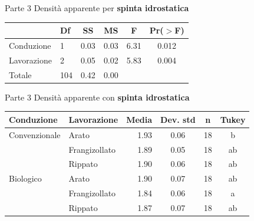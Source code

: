 \documentclass[10pt]{beamer}
\begin{document}
\begin{frame}{Parte 3 \small{Densità apparente per \bf{spinta idrostatica}}}
  \begin{table}
    \centering
    \begin{tabular}{llcccc}
      \hline
      & Df  & SS & MS & F & Pr($>$F) \\ 
      \hline
      Conduzione  & 1   & 0.03   & 0.03    & 6.31    & 0.012    \\ 
      Lavorazione & 2   & 0.05   & 0.02    & 5.83    & 0.004    \\ 
      Totale      & 104 & 0.42   & 0.00    &         &          \\ 
      \hline
    \end{tabular}
    \label{tab:Anova densita per spinta}
  \end{table}

\end{frame}

\begin{frame}{Parte 3 \small{Densità apparente con \bf{spinta idrostatica}}}

  \footnotesize
  \begin{table}[ht]
    \centering
    \begin{tabular}{llrccc}
      \hline
      Conduzione    & Lavorazione   & Media& Dev. std & n    & Tukey \\ 
      \hline
      Convenzionale & Arato         & 1.93 & 0.06      &  18 & b     \\ 
                    & Frangizollato & 1.89 & 0.05      &  18 & ab    \\ 
                    & Rippato       & 1.90 & 0.06      &  18 & ab    \\ 
      Biologico     & Arato         & 1.90 & 0.07      &  18 & ab    \\ 
                    & Frangizollato & 1.84 & 0.06      &  18 & a     \\ 
                    & Rippato       & 1.87 & 0.07      &  18 & ab    \\ 
      \hline
    \end{tabular}
    \label{tab:RiassuntoDensitaSpinta}
  \end{table}
\end{frame}
\end{document}
